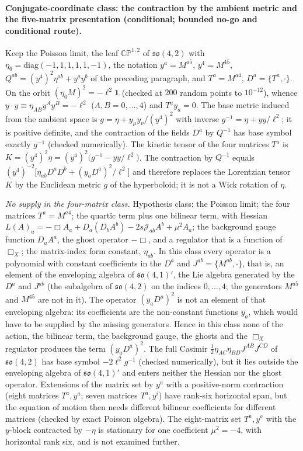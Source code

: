 \paragraph{Conjugate-coordinate class: the contraction by the ambient metric and the five-matrix presentation (conditional; bounded no-go and conditional route).}
Keep the Poisson limit, the leaf \(\mathbb{CP}^{1,2}\) of \(\mathfrak{so}(4,2)\) with \(\eta_6=\mathrm{diag}(-1,1,1,1,1,-1)\), the notation \(y^a=M^{a5}\), \(y^4=M^{45}\), \(Q^{ab}=(y^4)^2\eta^{ab}+y^ay^b\) of the preceding paragraph, and \(T^a=M^{a4}\), \(D^a=\{T^a,\cdot\}\). On the orbit \((\eta_6M)^2=-\ell^2\mathbf 1\) (checked at \(200\) random points to \(10^{-12}\)), whence \(y\cdot y\equiv\eta_{AB}y^Ay^B=-\ell^2\) (\(A,B=0,\dots,4\)) and \(T^ay_a=0\). The base metric induced from the ambient space is \(g=\eta+y_\mu y_\nu/(y^4)^2\) with inverse \(g^{-1}=\eta+yy/\ell^2\); it is positive definite, and the contraction of the fields \(D^a\) by \(Q^{-1}\) has base symbol exactly \(g^{-1}\) (checked numerically). The kinetic tensor of the four matrices \(T^a\) is \(K=(y^4)^2\eta=(y^4)^2\bigl(g^{-1}-yy/\ell^2\bigr)\). The contraction by \(Q^{-1}\) equals \((y^4)^{-2}\bigl[\eta_{ab}D^aD^b+(y_aD^a)^2/\ell^2\bigr]\) and therefore replaces the Lorentzian tensor \(K\) by the Euclidean metric \(g\) of the hyperboloid; it is not a Wick rotation of \(\eta\).

\emph{No supply in the four-matrix class.} Hypothesis class: the Poisson limit; the four matrices \(T^a=M^{a4}\); the quartic term plus one bilinear term, with Hessian \(L(A)_a=-\Box A_a+D_a(D_bA^b)-2s\mathcal J_{ab}A^b+\mu^2A_a\); the background gauge function \(D_aA^a\), the ghost operator \(-\Box\), and a regulator that is a function of \(\Box_X\); the matrix-index form constant, \(\eta_{ab}\). In this class every operator is a polynomial with constant coefficients in the \(D^a\) and \(J^{ab}=\{M^{ab},\cdot\}\), that is, an element of the enveloping algebra of \(\mathfrak{so}(4,1)'\), the Lie algebra generated by the \(D^a\) and \(J^{ab}\) (the subalgebra of \(\mathfrak{so}(4,2)\) on the indices \(0,\dots,4\); the generators \(M^{a5}\) and \(M^{45}\) are not in it). The operator \((y_aD^a)^2\) is not an element of that enveloping algebra: its coefficients are the non-constant functions \(y_a\), which would have to be supplied by the missing generators. Hence in this class none of the action, the bilinear term, the background gauge, the ghosts and the \(\Box_X\) regulator produces the term \((y_aD^a)^2\). The full Casimir \(\tfrac12\eta_{AC}\eta_{BD}J^{AB}J^{CD}\) of \(\mathfrak{so}(4,2)\) has base symbol \(-2\ell^2g^{-1}\) (checked numerically), but it lies outside the enveloping algebra of \(\mathfrak{so}(4,1)'\) and enters neither the Hessian nor the ghost operator. Extensions of the matrix set by \(y^a\) with a positive-norm contraction (eight matrices \(T^a,y^a\); seven matrices \(T^a,y^i\)) have rank-six horizontal span, but the equation of motion then needs different bilinear coefficients for different matrices (checked by exact Poisson algebra). The eight-matrix set \(T^a,y^a\) with the \(y\)-block contracted by \(-\eta\) is stationary for one coefficient \(\mu^2=-4\), with horizontal rank six, and is not examined further.

